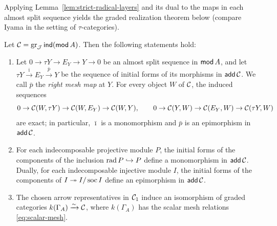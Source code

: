 Applying Lemma~\ref{lem:strict-radical-layers} and its dual to the maps in
each almost split sequence yields the graded realization theorem below
(compare Iyama \cite[Theorems~5.2 and~9.2]{IyamaI} in the setting of
$\tau$-categories).

\begin{proposition}
\label{prop:graded-realization}
Let $\mathcal C=\operatorname{gr}_\mathcal J\operatorname{\mathsf{ind}}(\operatorname{\mathsf{mod}} A)$. Then the following statements hold:
\begin{enumerate}[label={\upshape(\arabic*)}]
\item Let $0\to\tau Y\to E_Y\to Y\to0$ be an almost split sequence in
$\operatorname{\mathsf{mod}} A$, and let $\tau Y\xrightarrow{\bar\imath}E_Y\xrightarrow{\bar p}Y$
be the sequence of initial forms of its morphisms in $\operatorname{\mathsf{add}}\mathcal C$. We call
$\bar p$ the \emph{right mesh map} at $Y$. For every object $W$ of $\mathcal C$, the
induced sequences
\[
 0\to\mathcal C(W,\tau Y)\to\mathcal C(W,E_Y)\to\mathcal C(W,Y),\qquad
 0\to\mathcal C(Y,W)\to\mathcal C(E_Y,W)\to\mathcal C(\tau Y,W)
\]
are exact; in particular, $\bar\imath$ is a monomorphism and $\bar p$ is an
epimorphism in $\operatorname{\mathsf{add}}\mathcal C$.
\item For each indecomposable projective module $P$, the initial forms of
the components of the inclusion $\operatorname{rad} P\hookrightarrow P$ define a
monomorphism in $\operatorname{\mathsf{add}}\mathcal C$. Dually, for each indecomposable injective module
$I$, the initial forms of the components of $I\twoheadrightarrow I/\operatorname{soc} I$
define an epimorphism in $\operatorname{\mathsf{add}}\mathcal C$.
\item The chosen arrow representatives in $\mathcal C_1$ induce an isomorphism of
graded categories $k(\Gamma_A)\xrightarrow{\sim}\mathcal C$, where $k(\Gamma_A)$ has
the scalar mesh relations \eqref{eq:scalar-mesh}.
\end{enumerate}
\end{proposition}
